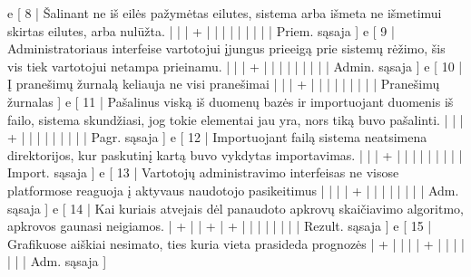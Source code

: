 {  e [ 8   | Šalinant ne iš eilės pažymėtas eilutes, sistema arba išmeta ne išmetimui
  skirtas eilutes, arba nulūžta.  
                    |   |   | + |   |   |   |   |   |   |   |      | Priem. sąsaja ]
  e [ 9   | Administratoriaus interfeise vartotojui įjungus prieeigą prie sistemų
  rėžimo, šis vis tiek vartotojui netampa prieinamu.     
                    |   |   | + |   |   |   |   |   |   |   |      | Admin. sąsaja ]
  e [ 10  | Į pranešimų žurnalą keliauja ne visi pranešimai     
                    |   |   | + |   |   |   |   |   |   |   |      | Pranešimų žurnalas ]
  e [ 11  | Pašalinus viską iš duomenų bazės ir importuojant duomenis iš failo,
  sistema skundžiasi, jog tokie elementai jau yra, nors tiką buvo pašalinti.     
                    |   |   | + |   |   |   |   |   |   |   |      | Pagr. sąsaja ]
  e [ 12  | Importuojant failą sistema neatsimena direktorijos, kur paskutinį
  kartą buvo vykdytas importavimas.   
                    |   |   | + |   |   |   |   |   |   |   |      | Import. sąsaja ]
  e [ 13  | Vartotojų administravimo interfeisas ne visose platformose reaguoja į
  aktyvaus naudotojo pasikeitimus  
                    |   |   |   | + |   |   |   |   |   |   |      | Adm. sąsaja ]
  e [ 14  | Kai kuriais atvejais dėl panaudoto apkrovų skaičiavimo algoritmo,
  apkrovos gaunasi neigiamos.
                    | + |   | + | + |   |   |   |   |   |   |      | Rezult. sąsaja ]
  e [ 15 | Grafikuose aiškiai nesimato, ties kuria vieta prasideda prognozės
                    | + |   |   |   | + |   |   |   |   |   |      | Adm. sąsaja ]

}
